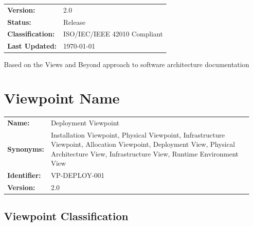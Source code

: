 \documentclass[11pt,letterpaper]{article}
\begin{document}
\begin{titlepage}
    \vspace{2cm}
    
    \begin{tabular}{ll}
        \textbf{Version:} & 2.0 \\
        \textbf{Status:} & Release \\
        \textbf{Classification:} & ISO/IEC/IEEE 42010 Compliant \\
        \textbf{Last Updated:} & \today \\
    \end{tabular}
    
    \vfill
    
    {\small Based on the Views and Beyond approach to software architecture documentation}
    
\end{titlepage}
\hypersetup{pageanchor=true}
\clearpage

\tableofcontents
\newpage

\section{Viewpoint Name}

\begin{definitionbox}
\begin{tabular}{@{}L{5.5cm}L{\dimexpr\linewidth-5.5cm-2\tabcolsep\relax}@{}}
\textbf{Name:} & Deployment Viewpoint \\[0.5em]
\textbf{Synonyms:} & Installation Viewpoint, Physical Viewpoint, Infrastructure Viewpoint, Allocation Viewpoint, Deployment View, Physical Architecture View, Infrastructure View, Runtime Environment View \\[0.5em]
\textbf{Identifier:} & VP-DEPLOY-001 \\[0.5em]
\textbf{Version:} & 2.0 \\
\end{tabular}
\end{definitionbox}

\subsection{Viewpoint Classification}
\end{document}
